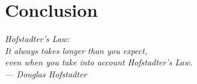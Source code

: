 \chapter{Conclusion}\label{ch:conc}

\begin{flushright}{\slshape
    Hofstadter's Law:\\
    It always takes longer than you expect,\\
    even when you take into account Hofstadter's Law.\\ \medskip
    --- Douglas Hofstadter}
\end{flushright}



